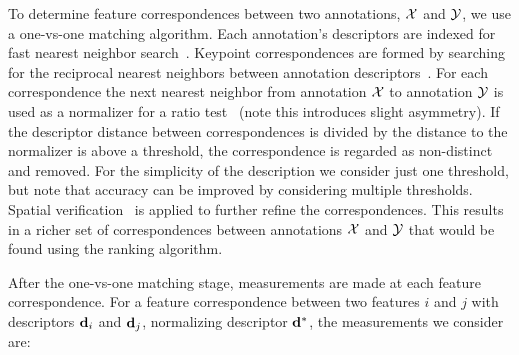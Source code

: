 To determine feature correspondences between two annotations, $\mathcal{X}$ and $\mathcal{Y}$, we use a one-vs-one matching
  algorithm.
Each annotation's descriptors are indexed for fast nearest neighbor search~\cite{muja_fast_2009}.
Keypoint correspondences are formed by searching for the reciprocal nearest neighbors between annotation
  descriptors~\cite{qin_hello_2011}.
For each correspondence the next nearest neighbor from annotation $\mathcal{X}$ to annotation $\mathcal{Y}$ is used as a
  normalizer for a ratio test~\cite{lowe_distinctive_2004} (note this introduces slight asymmetry).
If the descriptor distance between correspondences is divided by the distance to the normalizer is above a
  threshold, the correspondence is regarded as non-distinct and removed.
For the simplicity of the description we consider just one threshold, but note that accuracy can be improved by
  considering multiple thresholds.
Spatial verification~\cite{philbin_object_2007} is applied to further refine the correspondences.
This results in a richer set of correspondences between annotations $\mathcal{X}$ and $\mathcal{Y}$ that would be found using
  the ranking algorithm.

After the one-vs-one matching stage, measurements are made at each feature correspondence.
For a feature correspondence between two features $i$ and $j$ with descriptors $\mathbf{d}_i$ and $\mathbf{d}_j$,
  normalizing descriptor $\mathbf{d}^{*}$, the measurements we consider are:


